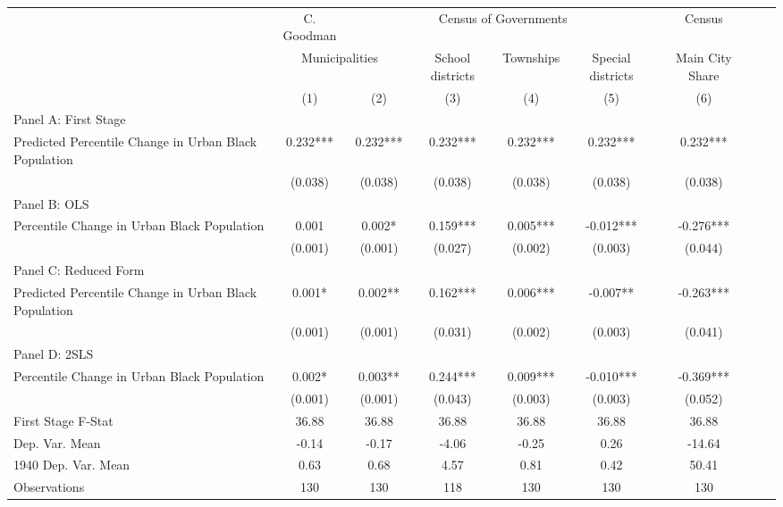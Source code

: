  \begin{tabular}{l*{8}{c}} \toprule
&\multicolumn{1}{c}{C. Goodman}&\multicolumn{4}{c}{Census of Governments}&\multicolumn{1}{c}{Census}\\\cmidrule(lr){2-2}\cmidrule(lr){3-6}\cmidrule(lr){7-7}
&\multicolumn{2}{c}{Municipalities}&\multicolumn{1}{c}{School districts}&\multicolumn{1}{c}{Townships}&\multicolumn{1}{c}{Special districts}&\multicolumn{1}{c}{Main City Share}\\\cmidrule(lr){2-3}\cmidrule(lr){4-6}\cmidrule(lr){7-7}
&\multicolumn{1}{c}{(1)}&\multicolumn{1}{c}{(2)}&\multicolumn{1}{c}{(3)}&\multicolumn{1}{c}{(4)}&\multicolumn{1}{c}{(5)}&\multicolumn{1}{c}{(6)}\\
\cmidrule(lr){1-7}
\multicolumn{6}{l}{Panel A: First Stage}\\
\cmidrule(lr){1-7}
Predicted Percentile Change in Urban Black Population&    0.232***&    0.232***&    0.232***&    0.232***&    0.232***&    0.232***\\
                &  (0.038)   &  (0.038)   &  (0.038)   &  (0.038)   &  (0.038)   &  (0.038)   \\
\cmidrule(lr){1-7}
\multicolumn{6}{l}{Panel B: OLS}\\
\cmidrule(lr){1-7}
Percentile Change in Urban Black Population&    0.001   &    0.002*  &    0.159***&    0.005***&   -0.012***&   -0.276***\\
                &  (0.001)   &  (0.001)   &  (0.027)   &  (0.002)   &  (0.003)   &  (0.044)   \\
\cmidrule(lr){1-7}
\multicolumn{6}{l}{Panel C: Reduced Form}\\
\cmidrule(lr){1-7}
Predicted Percentile Change in Urban Black Population&    0.001*  &    0.002** &    0.162***&    0.006***&   -0.007** &   -0.263***\\
                &  (0.001)   &  (0.001)   &  (0.031)   &  (0.002)   &  (0.003)   &  (0.041)   \\
\cmidrule(lr){1-7}
\multicolumn{6}{l}{Panel D: 2SLS}\\
\cmidrule(lr){1-7}
Percentile Change in Urban Black Population&    0.002*  &    0.003** &    0.244***&    0.009***&   -0.010***&   -0.369***\\
                &  (0.001)   &  (0.001)   &  (0.043)   &  (0.003)   &  (0.003)   &  (0.052)   \\
\midrule
First Stage F-Stat&    36.88   &    36.88   &    36.88   &    36.88   &    36.88   &    36.88   \\
Dep. Var. Mean  &    -0.14   &    -0.17   &    -4.06   &    -0.25   &     0.26   &   -14.64   \\
1940 Dep. Var. Mean&     0.63   &     0.68   &     4.57   &     0.81   &     0.42   &    50.41   \\
Observations    &      130   &      130   &      118   &      130   &      130   &      130   \\
 \bottomrule \end{tabular}
